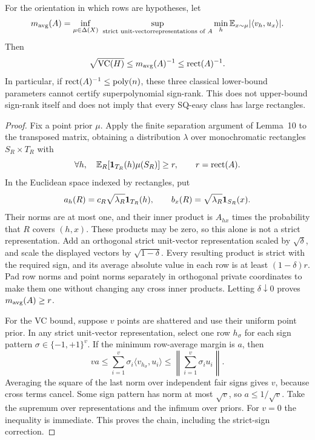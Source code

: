 \begin{proposition}\label{thm:classicalbarrier}
For the orientation in which rows are hypotheses, let
\[
 m_{\rm avg}(A)=\inf_{\mu\in\Delta(X)}\ 
 \sup_{\substack{\text{strict unit-vector}\text{representations of }A}}
 \min_h\E_{x\sim\mu}|\langle v_h,u_x\rangle|.
\]
Then
\[
 \sqrt{\operatorname{VC}(H)}\le m_{\rm avg}(A)^{-1}\le\operatorname{rect}(A)^{-1}.
\]
In particular, if $\operatorname{rect}(A)^{-1}\le\operatorname{poly}(n)$, these three classical lower-bound parameters cannot certify superpolynomial sign-rank. This does not upper-bound sign-rank itself and does not imply that every SQ-easy class has large rectangles.
\end{proposition}
\begin{proof}
Fix a point prior $\mu$. Apply the finite separation argument of Lemma~10 to the transposed matrix, obtaining a distribution $\lambda$ over monochromatic rectangles $S_R\times T_R$ with
\[
 \forall h,\quad\mathbb E_R[\mathbf 1_{T_R}(h)\mu(S_R)]\ge r,
 \qquad r=\operatorname{rect}(A).
\]
In the Euclidean space indexed by rectangles, put
\[
 a_h(R)=c_R\sqrt{\lambda_R}\mathbf 1_{T_R}(h),\qquad
 b_x(R)=\sqrt{\lambda_R}\mathbf 1_{S_R}(x).
\]
Their norms are at most one, and their inner product is $A_{hx}$ times the probability that $R$ covers $(h,x)$. These products may be zero, so this alone is not a strict representation. Add an orthogonal strict unit-vector representation scaled by $\sqrt\delta$, and scale the displayed vectors by $\sqrt{1-\delta}$. Every resulting product is strict with the required sign, and its average absolute value in each row is at least $(1-\delta)r$. Pad row norms and point norms separately in orthogonal private coordinates to make them one without changing any cross inner products. Letting $\delta\downarrow0$ proves $m_{\rm avg}(A)\ge r$.

For the VC bound, suppose $v$ points are shattered and use their uniform point prior. In any strict unit-vector representation, select one row $h_\sigma$ for each sign pattern $\sigma\in\{-1,+1\}^v$. If the minimum row-average margin is $a$, then
\[
 va\le\sum_{i=1}^v\sigma_i\langle v_{h_\sigma},u_i\rangle
 \le\left\|\sum_{i=1}^v\sigma_i u_i\right\|.
\]
Averaging the square of the last norm over independent fair signs gives $v$, because cross terms cancel. Some sign pattern has norm at most $\sqrt v$, so $a\le1/\sqrt v$. Take the supremum over representations and the infimum over priors. For $v=0$ the inequality is immediate. This proves the chain, including the strict-sign correction.
\end{proof}

